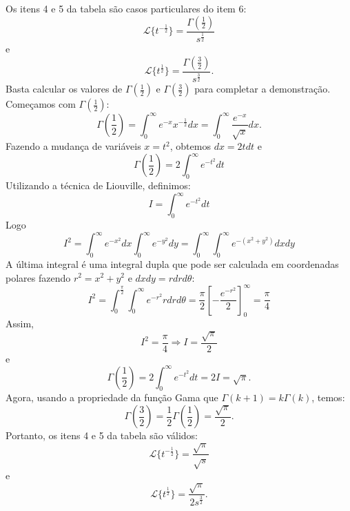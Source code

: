 \documentclass[Main.tex]{subfiles}
\begin{document}
\begin{ex} Os itens 4 e 5 da tabela são casos particulares do item 6:
 $$
 \mathcal{L}\{t^{-\frac{1}{2}}\}=\frac{\Gamma\left(\frac{1}{2}\right)}{s^{\frac{1}{2}}}
 $$
e
 $$
 \mathcal{L}\{t^{\frac{1}{2}}\}=\frac{\Gamma\left(\frac{3}{2}\right)}{s^{\frac{3}{2}}}.
 $$
 Basta calcular os valores de $\Gamma\left(\frac{1}{2}\right)$ e $\Gamma\left(\frac{3}{2}\right)$ para completar a demonstração. Começamos com $\Gamma\left(\frac{1}{2}\right)$:
 $$
 \Gamma\left(\frac{1}{2}\right)=\int_0^\infty e^{-x}x^{-\frac{1}{2}}dx=\int_0^\infty \frac{e^{-x}}{\sqrt{x}}dx.
 $$
 Fazendo a mudança de variáveis $x=t^{2}$, obtemos $dx=2tdt$ e
$$\Gamma\left(\frac{1}{2}\right)=2\int_{0}^{\infty}e^{-t^2}dt
$$
Utilizando a técnica de Liouville, definimos:
$$
I=\int_{0}^{\infty}e^{-t^2}dt
$$
Logo
$$
I^2=\int_{0}^{\infty}e^{-x^2}dx\int_{0}^{\infty}e^{-y^2}dy=\int_{0}^{\infty}\int_{0}^{\infty}e^{-(x^2+y^2)}dx dy
$$
A última integral é uma integral dupla que pode ser calculada em coordenadas polares fazendo $r^2=x^2+y^2$ e $dxdy=rdrd\theta$:
$$
I^2=\int_{0}^{\frac{\pi}{2}}\int_{0}^{\infty}e^{-r^2}rdr d{\theta}=\frac{\pi}{2}\left[-\frac{e^{-r^2}}{2}\right]_0^\infty=\frac{\pi}{4}
$$
Assim,
$$
I^2=\frac{\pi}{4}\Rightarrow I=\frac{\sqrt{\pi}}{2}
$$
e
$$
\Gamma\left(\frac{1}{2}\right)=2\int_{0}^{\infty}e^{-t^2}dt=2I=\sqrt{\pi}.
$$
Agora, usando a propriedade da função Gama que $\Gamma(k+1)=k\Gamma(k)$, temos:
$$
\Gamma\left(\frac{3}{2}\right)=\frac{1}{2}\Gamma\left(\frac{1}{2}\right)=\frac{\sqrt{\pi}}{2}.
$$
Portanto, os itens 4 e 5 da tabela são válidos:
$$
 \mathcal{L}\{t^{-\frac{1}{2}}\}=\frac{\sqrt{\pi}}{\sqrt{s}}
$$
e
$$
 \mathcal{L}\{t^{\frac{1}{2}}\}=\frac{\sqrt{\pi}}{2s^{\frac{3}{2}}}.
$$
 \end{ex}
\end{document}
